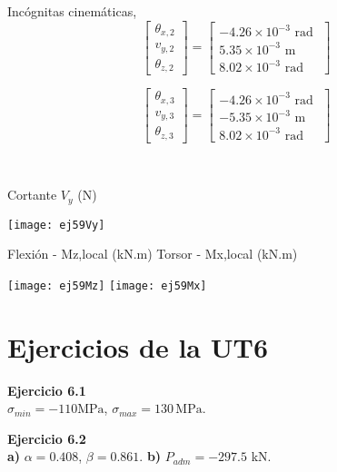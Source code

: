 \begin{minipage}{0.45\textwidth}
	Incógnitas cinemáticas,
	$$
	\left[
	\begin{matrix}
	\theta_{x,2} \\
	v_{y,2} \\
	\theta_{z,2}
	\end{matrix}
	\right]
	=
	\left[
	\begin{matrix}
	-4.26\times 10^{-3} \text{ rad }\\
	 5.35\times 10^{-3} \text{ m }\\
	8.02\times 10^{-3} \text{ rad }
	\end{matrix}
	\right]
	$$
	
	$$
	\left[
	\begin{matrix}
	\theta_{x,3} \\
	v_{y,3} \\
	\theta_{z,3}
	\end{matrix}
	\right]
	=
	\left[
	\begin{matrix}
	-4.26\times 10^{-3} \text{ rad }\\
	-5.35\times 10^{-3} \text{ m }\\
	 8.02\times 10^{-3} \text{ rad }
	\end{matrix}
	\right]
	$$
\end{minipage}
~
\begin{minipage}{0.45\textwidth}
	Cortante $V_y$ (N)
	
	\texttt{[image: ej59Vy]}
\end{minipage}


Flexión - Mz,local (kN.m) \hfill  Torsor - Mx,local (kN.m)

\texttt{[image: ej59Mz]}
\texttt{[image: ej59Mx]}

\newpage


\section{Ejercicios de la UT6}

\textbf{Ejercicio 6.1}\\

 $\sigma_{min} = -110 \text{MPa}$, $\sigma_{max} = 130 \, \text{MPa}$.\newline


\textbf{Ejercicio 6.2}\\

\textbf{a)} $\alpha = 0.408$, $\beta = 0.861$. 
\textbf{b)} $P_{adm} = -297.5 $ kN.\newline

